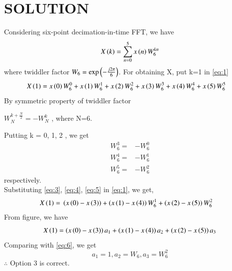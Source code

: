 \documentclass[journal,12pt,twocolumn]{IEEEtran}
\begin{document}
\section*{SOLUTION}
Considering six-point decimation-in-time FFT, we have 
\\
\begin{align}
\label{eq:1}
X\left(k\right) = \sum_{n=0}^5 x\left(n\right) W_{6}^{kn}
\end{align}
where twiddler factor $W_{6} = \text{exp}\left(-\frac{j2\pi}{6}\right)$.
For obtaining X, put k=1 in \eqref{eq:1}
\\
{\small
\begin{align}
X\left(1\right)={}& x\left(0\right)W_{6}^{0}+x\left(1\right)W_{6}^{1}+x\left(2\right)W_{6}^{2}+x\left(3\right)W_{6}^{3}+x\left(4\right)W_{6}^{4}+x\left(5\right)W_{6}^{5}
\label{eq:2}
\end{align}
}
By symmetric property of twiddler factor 
\begin{center}
$W_{N}^{k+\frac{N}{2}} = -W_{N}^{k}$ , where N=6.
\end{center}
Putting k = 0, 1, 2 , we get \\
\begin{align}
\label{eq:3}
W_{6}^{3}={}&-W_{6}^{0}\\
\label{eq:4}
W_{6}^{4}={}&-W_{6}^{1}\\
\label{eq:5}
W_{6}^{5}={}&-W_{6}^{2}
\end{align}
respectively.\\
Substituting \eqref{eq:3}, \eqref{eq:4}, \eqref{eq:5} in \eqref{eq:1}, we get,
\begin{align}
X\left(1\right)={}&\left(x\left(0\right)-x\left(3\right)\right) + \left(x\left(1\right)-x\left(4\right)\right)W_{6}^{1} + \left(x\left(2\right)-x\left(5\right)\right)W_{6}^{2}
\label{eq:6}
\end{align}
From figure, we have 
$$X\left(1\right)=\left(x\left(0\right)-x\left(3\right)\right)a_{1} + \left(x\left(1\right)-x\left(4\right)\right)a_{2} + \left(x\left(2\right)-x\left(5\right)\right)a_{3}$$
Comparing with \eqref{eq:6}, we get 
$$a_{1}=1, a_{2}=W_{6}, a_{3}=W_{6}^{2}$$
$\therefore$ Option 3 is correct.
\end{document}
